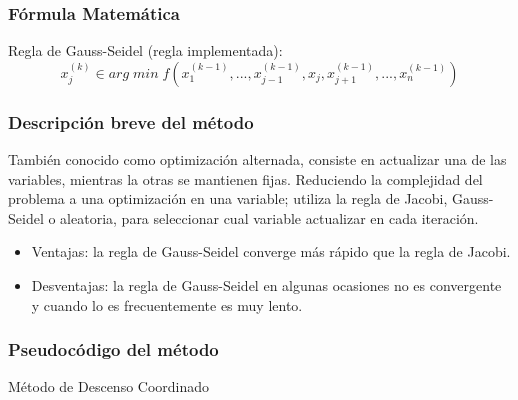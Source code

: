 \documentclass[12pt]{article}
\begin{document}
\subsubsection{Fórmula Matemática}
Regla de Gauss-Seidel (regla implementada):
\[x_{j}^{(k)} \in arg\; min\; f(x_{1}^{(k-1)}, ... ,x_{j-1}^{(k-1)}, x_{j},x_{j+1}^{(k-1)}, ... ,x_{n}^{(k-1)} )\]
\subsubsection{Descripción breve del método}
También conocido como optimización alternada, consiste en actualizar una de las variables, mientras la otras se mantienen fijas. Reduciendo la complejidad del problema a una optimización en una variable; utiliza la regla de Jacobi, Gauss-Seidel o aleatoria, para seleccionar cual variable actualizar en cada iteración.
\begin{itemize}
    \item Ventajas: la regla de Gauss-Seidel converge más rápido que la regla de Jacobi.
    \item Desventajas: la regla de Gauss-Seidel en algunas ocasiones no es convergente y cuando lo es frecuentemente es muy lento.
\end{itemize}
\subsubsection{Pseudocódigo del método}
\begin{algorithm}[H]
\caption{Método de Descenso Coordinado}
    \SetAlgoLined

\end{algorithm}
\end{document}
